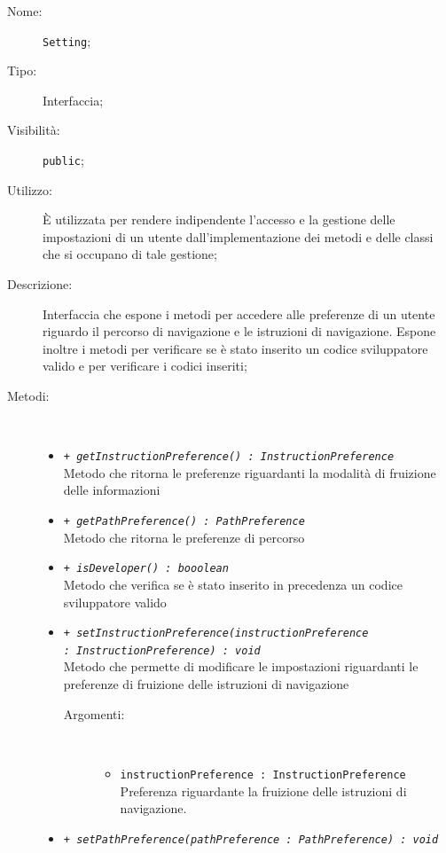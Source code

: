 \documentclass[../DefinizioneDiProdotto.tex]{subfiles}
\begin{document}
\begin{description}
	\item[Nome:] \texttt{Setting};
	\item[Tipo:] Interfaccia;
	\item[Visibilità:] \texttt{public};
	\item[Utilizzo:] È utilizzata per rendere indipendente l'accesso e la gestione delle impostazioni di un utente dall'implementazione dei metodi e delle classi che si occupano di tale gestione;
	\item[Descrizione:] Interfaccia che espone i metodi per accedere alle preferenze di un utente riguardo il percorso di navigazione e le istruzioni di navigazione. Espone inoltre i metodi per verificare se è stato inserito un codice sviluppatore valido e per verificare i codici inseriti;
	\item[Metodi:] \
	\begin{itemize}
		\item \texttt{+ \textit{getInstructionPreference() : InstructionPreference}}\\
		Metodo che ritorna le preferenze riguardanti la modalità di fruizione delle informazioni
		\item \texttt{+ \textit{getPathPreference() : PathPreference}}\\
		Metodo che ritorna le preferenze di percorso
		\item \texttt{+ \textit{isDeveloper() : booolean}}\\
		Metodo che verifica se è stato inserito in precedenza un codice sviluppatore valido
		\item \texttt{+ \textit{setInstructionPreference(instructionPreference \\ : InstructionPreference) : void}}\\
		Metodo che permette di modificare le impostazioni riguardanti le preferenze di fruizione delle istruzioni di navigazione
		\begin{description}
			\item[Argomenti:] \
			\begin{itemize}
				\item \texttt{instructionPreference : InstructionPreference}\\
				Preferenza riguardante la fruizione delle istruzioni di navigazione.\end{itemize}
		\end{description}
		\item \texttt{+ \textit{setPathPreference(pathPreference : PathPreference) : void}}\\

\end{itemize}
\end{description}
\end{document}
